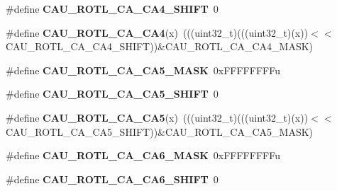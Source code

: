 \begin{DoxyCompactItemize}
\item 
\#define {\bfseries C\+A\+U\+\_\+\+R\+O\+T\+L\+\_\+\+C\+A\+\_\+\+C\+A4\+\_\+\+S\+H\+I\+FT}~0\hypertarget{group__CAU__Register__Masks_ga696c3db5a2a4f5c7452d2b3ff573f7c1}{}\label{group__CAU__Register__Masks_ga696c3db5a2a4f5c7452d2b3ff573f7c1}

\item 
\#define {\bfseries C\+A\+U\+\_\+\+R\+O\+T\+L\+\_\+\+C\+A\+\_\+\+C\+A4}(x)~(((uint32\+\_\+t)(((uint32\+\_\+t)(x))$<$$<$C\+A\+U\+\_\+\+R\+O\+T\+L\+\_\+\+C\+A\+\_\+\+C\+A4\+\_\+\+S\+H\+I\+FT))\&C\+A\+U\+\_\+\+R\+O\+T\+L\+\_\+\+C\+A\+\_\+\+C\+A4\+\_\+\+M\+A\+SK)\hypertarget{group__CAU__Register__Masks_ga5f2d73933e12500c6b1e2c437c4255a4}{}\label{group__CAU__Register__Masks_ga5f2d73933e12500c6b1e2c437c4255a4}

\item 
\#define {\bfseries C\+A\+U\+\_\+\+R\+O\+T\+L\+\_\+\+C\+A\+\_\+\+C\+A5\+\_\+\+M\+A\+SK}~0x\+F\+F\+F\+F\+F\+F\+F\+Fu\hypertarget{group__CAU__Register__Masks_gabe2d7ee2c1b7e53de4b94cd8b07970c7}{}\label{group__CAU__Register__Masks_gabe2d7ee2c1b7e53de4b94cd8b07970c7}

\item 
\#define {\bfseries C\+A\+U\+\_\+\+R\+O\+T\+L\+\_\+\+C\+A\+\_\+\+C\+A5\+\_\+\+S\+H\+I\+FT}~0\hypertarget{group__CAU__Register__Masks_gafa3e712c8b162bbf2553bc695bdcab76}{}\label{group__CAU__Register__Masks_gafa3e712c8b162bbf2553bc695bdcab76}

\item 
\#define {\bfseries C\+A\+U\+\_\+\+R\+O\+T\+L\+\_\+\+C\+A\+\_\+\+C\+A5}(x)~(((uint32\+\_\+t)(((uint32\+\_\+t)(x))$<$$<$C\+A\+U\+\_\+\+R\+O\+T\+L\+\_\+\+C\+A\+\_\+\+C\+A5\+\_\+\+S\+H\+I\+FT))\&C\+A\+U\+\_\+\+R\+O\+T\+L\+\_\+\+C\+A\+\_\+\+C\+A5\+\_\+\+M\+A\+SK)\hypertarget{group__CAU__Register__Masks_gab4b993bf334fc493926a37f57c2a0f6e}{}\label{group__CAU__Register__Masks_gab4b993bf334fc493926a37f57c2a0f6e}

\item 
\#define {\bfseries C\+A\+U\+\_\+\+R\+O\+T\+L\+\_\+\+C\+A\+\_\+\+C\+A6\+\_\+\+M\+A\+SK}~0x\+F\+F\+F\+F\+F\+F\+F\+Fu\hypertarget{group__CAU__Register__Masks_ga65aeaeccabea3838690c668b87c2c773}{}\label{group__CAU__Register__Masks_ga65aeaeccabea3838690c668b87c2c773}

\item 
\#define {\bfseries C\+A\+U\+\_\+\+R\+O\+T\+L\+\_\+\+C\+A\+\_\+\+C\+A6\+\_\+\+S\+H\+I\+FT}~0\hypertarget{group__CAU__Register__Masks_ga1185b9302856e4d9138c798916b4cb6f}{}\label{group__CAU__Register__Masks_ga1185b9302856e4d9138c798916b4cb6f}


\end{DoxyCompactItemize}
